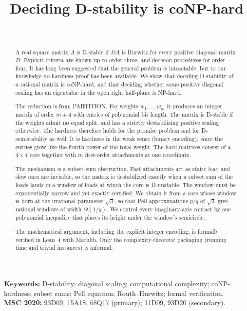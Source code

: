 \documentclass[11pt,a4paper]{article}
\title{Deciding D-stability is coNP-hard}
\author{\PaperAuthor\\[2pt]\small\PaperAffiliation}
\date{\PaperDate}
\theoremstyle{plain}
\theoremstyle{definition}
\theoremstyle{remark}
\begin{document}
\maketitle

\begin{abstract}
A real square matrix $A$ is D-stable if $DA$ is Hurwitz for every positive
diagonal matrix $D$. Explicit criteria are known up to order three, and decision
procedures for order four. It has long been suggested that the general problem is
intractable, but to our knowledge no hardness proof has been available. We show that deciding
D-stability of a rational matrix is coNP-hard, and that deciding whether some
positive diagonal scaling has an eigenvalue in the open right half-plane is
NP-hard.

The reduction is from PARTITION. For weights $w_1,\dots,w_m$ it produces an
integer matrix of order $m+4$ with entries of polynomial bit length. The matrix is
D-stable if the weights admit no equal split, and has a strictly destabilizing
positive scaling otherwise. The hardness therefore holds for the promise problem
and for D-semistability as well. It is hardness in the weak sense (binary
encoding), since the entries grow like the fourth power of the total weight. The
hard matrices consist of a $4\times4$ core together with $m$ first-order
attachments at one coordinate.

The mechanism is a subset-sum obstruction. Fast attachments act as static load and
slow ones are invisible, so the matrix is destabilized exactly when a subset sum of
the loads lands in a window of loads at which the core is D-unstable. The window
must be exponentially narrow and yet exactly certified. We obtain it from a core
whose window is born at the irrational parameter $\sqrt3$, so that Pell
approximations $p/q$ of $\sqrt3$ give rational windows of width $\Theta(1/q)$. We
control every imaginary-axis contact by one polynomial inequality that places its
height under the window's semicircle.

The mathematical argument, including the explicit integer encoding, is formally
verified in Lean~4 with Mathlib. Only the complexity-theoretic packaging (running time and trivial instances) is
informal.
\end{abstract}

\noindent\textbf{Keywords:} D-stability; diagonal scaling; computational complexity;
coNP-hardness; subset sums; Pell equation; Routh--Hurwitz; formal verification.\\[2pt]
\textbf{MSC 2020:} 93D09, 15A18, 68Q17 (primary); 11D09, 93D20 (secondary).
\end{document}
